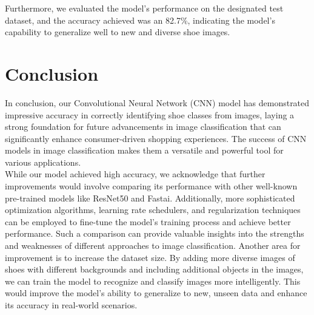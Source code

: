 \documentclass[11pt,a4paper]{article}
\begin{document}
\begin{table}[h!]
\centering
{}
\caption{Result of Model Training and Validation Accuracy After Additional Layers with Epochs}
\label{tab:refined_train_loss}
\end{table}

Furthermore, we evaluated the model's performance on the designated test dataset, and the accuracy achieved was an 82.7\%, indicating the model's capability to generalize well to new and diverse shoe images.

\section{Conclusion}
In conclusion, our Convolutional Neural Network (CNN) model has demonstrated impressive accuracy in correctly identifying shoe classes from images, laying a strong foundation for future advancements in image classification that can significantly enhance consumer-driven shopping experiences. The success of CNN models in image classification makes them a versatile and powerful tool for various applications. \\

\noindent While our model achieved high accuracy, we acknowledge that further improvements would involve comparing its performance with other well-known pre-trained models like ResNet50 and Fastai. Additionally, more sophisticated optimization algorithms, learning rate schedulers, and regularization techniques can be employed to fine-tune the model's training process and achieve better performance. Such a comparison can provide valuable insights into the strengths and weaknesses of different approaches to image classification. Another area for improvement is to increase the dataset size. By adding more diverse images of shoes with different backgrounds and including additional objects in the images, we can train the model to recognize and classify images more intelligently. This would improve the model's ability to generalize to new, unseen data and enhance its accuracy in real-world scenarios. \\
\end{document}
